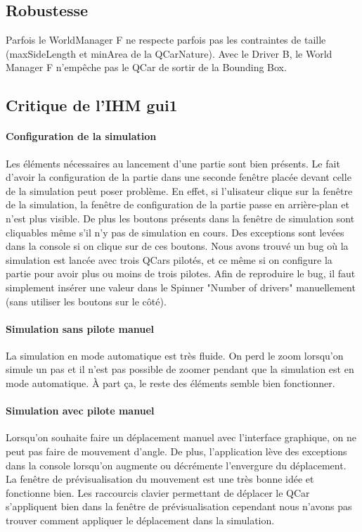 \documentclass[a4paper, 12pt]{article}
\begin{document}
\subsection{Robustesse}
Parfois le WorldManager F ne respecte parfois pas les contraintes de taille (maxSideLength et minArea de la QCarNature). Avec le Driver B, le World Manager F n'empêche pas le QCar de sortir de la Bounding Box. 
\subsection{Critique de l'IHM gui1}
\paragraph{Configuration de la simulation}
Les éléments nécessaires au lancement d'une partie sont bien présents. Le fait d'avoir la configuration de la partie dans une seconde fenêtre placée devant celle de la simulation peut poser problème. En effet, si l'ulisateur clique sur la fenêtre de la simulation, la fenêtre de configuration de la partie passe en arrière-plan et n'est plus visible. De plus les boutons présents dans la fenêtre de simulation sont cliquables même s’il n'y pas de simulation en cours. Des exceptions sont levées dans la console si on clique sur de ces boutons. Nous avons trouvé un bug où la simulation est lancée avec trois QCars pilotés, et ce même si on configure la partie pour avoir plus ou moins de trois pilotes. Afin de reproduire le bug, il faut simplement insérer une valeur dans le Spinner "Number of drivers" manuellement (sans utiliser les boutons sur le côté).
\paragraph{Simulation sans pilote manuel}
La simulation en mode automatique est très fluide. On perd le zoom lorsqu'on simule un pas et il n'est pas possible de zoomer pendant que la simulation est en mode automatique. À part ça, le reste des éléments semble bien fonctionner.
\paragraph{Simulation avec pilote manuel}
Lorsqu'on souhaite faire un déplacement manuel avec l'interface graphique, on ne peut pas faire de mouvement d'angle. De plus, l'application lève des exceptions dans la console lorsqu'on augmente ou décrémente l'envergure du déplacement. La fenêtre de prévisualisation du mouvement est une très bonne idée et fonctionne bien. Les raccourcis clavier permettant de déplacer le QCar s'appliquent bien dans la fenêtre de prévisualisation cependant nous n'avons pas trouver comment appliquer le déplacement dans la simulation.
\end{document}
